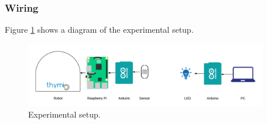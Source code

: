 \subsubsection{Wiring}
Figure \ref{fig:wiring2} shows a diagram of the experimental setup.

\begin{figure}[hbt]
\centering
  \includegraphics[width=400px]{img/wiring2}
  \caption{Experimental setup.}
  \label{fig:wiring2}
\end{figure}

